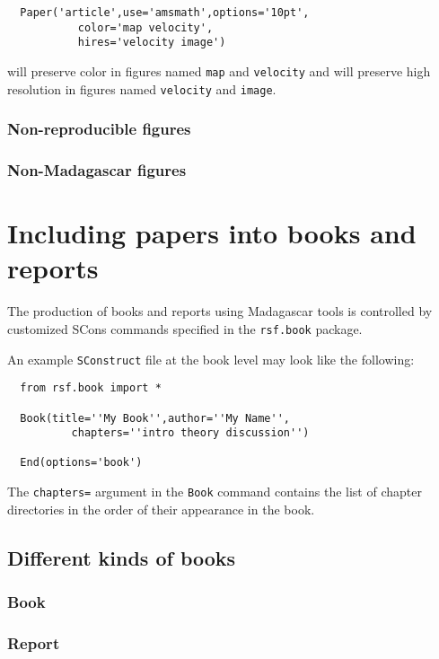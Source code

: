 {{\begin{lstlisting}
  Paper('article',use='amsmath',options='10pt',
           color='map velocity',
           hires='velocity image')
\end{lstlisting}
will preserve color in figures named \texttt{map} and
\texttt{velocity} and will preserve high resolution in figures named
\texttt{velocity} and \texttt{image}.

\subsubsection{Non-reproducible figures}

\subsubsection{Non-Madagascar figures}

\section{Including papers into books and reports}

The production of books and reports using Madagascar tools is
controlled by customized SCons commands specified in the
\texttt{rsf.book} package.

An example \texttt{SConstruct} file at the book level may look like
the following:
\lstset{language=python,showstringspaces=false,frame=single}
\begin{lstlisting}
  from rsf.book import *

  Book(title=''My Book'',author=''My Name'',
          chapters=''intro theory discussion'')

  End(options='book')
\end{lstlisting}
The \texttt{chapters=} argument in the \texttt{Book} command contains
the list of chapter directories in the order of their appearance in
the book.

\subsection{Different kinds of books}

\subsubsection{Book}

\subsubsection{Report}

}}
